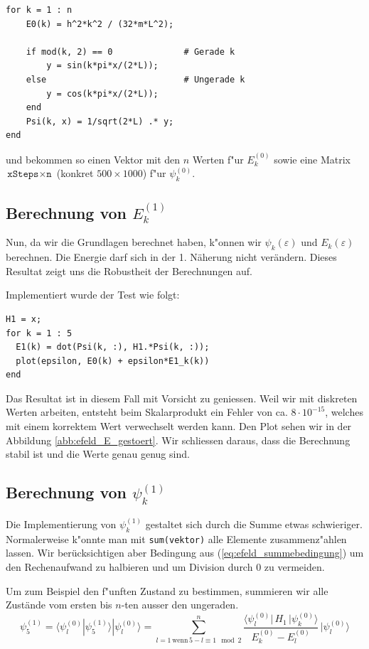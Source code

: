 \begin{refsection}
\begin{lstlisting}[style=Matlab]
for k = 1 : n
    E0(k) = h^2*k^2 / (32*m*L^2);
    
    if mod(k, 2) == 0              # Gerade k
        y = sin(k*pi*x/(2*L));
    else                           # Ungerade k
        y = cos(k*pi*x/(2*L));
    end
    Psi(k, x) = 1/sqrt(2*L) .* y;
end
\end{lstlisting}
und bekommen so einen Vektor mit den $n$ Werten f"ur $E_k^{(0)}$
sowie eine Matrix $\texttt{xSteps} \times \texttt{n}$ (konkret $500 \times 1000$) f"ur $\psi_k^{(0)}$.

\subsection{Berechnung von $E_k^{(1)}$}

Nun, da wir die Grundlagen berechnet haben, k"onnen wir $\psi_k(\varepsilon)$ und 
$E_k(\varepsilon)$ berechnen. Die Energie darf sich in der 1. N\"aherung nicht ver\"andern.
Dieses Resultat zeigt uns die Robustheit der Berechnungen auf.

Implementiert wurde der Test wie folgt:
\begin{lstlisting}[style=Matlab]
H1 = x;
for k = 1 : 5
  E1(k) = dot(Psi(k, :), H1.*Psi(k, :));
  plot(epsilon, E0(k) + epsilon*E1_k(k))
end
\end{lstlisting}
Das Resultat ist in diesem Fall mit Vorsicht zu geniessen.
Weil wir mit diskreten Werten arbeiten, entsteht beim Skalarprodukt ein Fehler von ca. $8 \cdot 10^{-15}$,
welches mit einem korrektem Wert verwechselt werden kann.
Den Plot sehen wir in der Abbildung \ref{abb:efeld_E_gestoert}.
Wir schliessen daraus, dass die Berechnung stabil ist und die Werte genau genug sind.





\subsection{Berechnung von $\psi_k^{(1)}$}

Die Implementierung von $\psi_k^{(1)}$ gestaltet sich durch die Summe etwas schwieriger.
Normalerweise k"onnte man mit \verb|sum(vektor)| alle Elemente zusammenz"ahlen lassen.
Wir ber\"ucksichtigen aber Bedingung aus (\ref{eq:efeld_summebedingung}) um den Rechenaufwand zu halbieren
und um Division durch $0$ zu vermeiden.

Um zum Beispiel den f"unften Zustand zu bestimmen, summieren wir alle Zust\"ande vom 
ersten bis $n$-ten ausser den ungeraden.
\begin{equation}
  \psi_5^{(1)} = \langle\psi_l^{(0)}|\psi_5^{(1)}\rangle|\psi_l^{(0)}\rangle = 
  \sum_{l=1 \, \text{wenn} \, 5-l \equiv 1 \mod 2}^{n}
    \frac{\langle \psi_l^{(0)}|\, H_1 \,|\psi_k^{(0)}\rangle}{E_k^{(0)}-E_l^{(0)}}
        \,
    |\psi_l^{(0)}\rangle
\end{equation}


\end{refsection}
